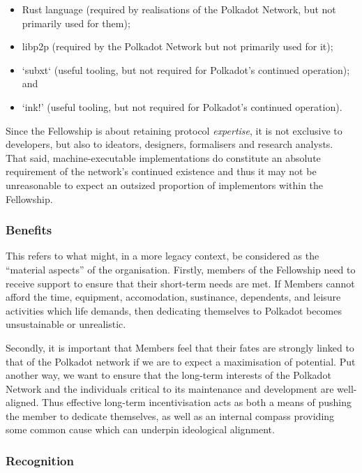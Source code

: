 \documentclass[9pt,oneside]{amsart}
\begin{document}
\begin{itemize}
  \item Rust language (required by realisations of the Polkadot Network, but not primarily used for them);
  \item libp2p (required by the Polkadot Network but not primarily used for it);
  \item `subxt` (useful tooling, but not required for Polkadot's continued operation); and
  \item `ink!' (useful tooling, but not required for Polkadot's continued operation).
\end{itemize}

Since the Fellowship is about retaining protocol \textit{expertise}, it is not exclusive to developers, but also to ideators, designers, formalisers and research analysts. That said, machine-executable implementations do constitute an absolute requirement of the network's continued existence and thus it may not be unreasonable to expect an outsized proportion of implementors within the Fellowship.

\subsubsection{Benefits}

This refers to what might, in a more legacy context, be considered as the ``material aspects'' of the organisation. Firstly, members of the Fellowship need to receive support to ensure that their short-term needs are met. If Members cannot afford the time, equipment, accomodation, sustinance, dependents, and leisure activities which life demands, then dedicating themselves to Polkadot becomes unsustainable or unrealistic.

Secondly, it is important that Members feel that their fates are strongly linked to that of the Polkadot network if we are to expect a maximisation of potential. Put another way, we want to ensure that the long-term interests of the Polkadot Network and the individuals critical to its maintenance and development are well-aligned. Thus effective long-term incentivisation acts as both a means of pushing the member to dedicate themselves, as well as an internal compass providing some common cause which can underpin ideological alignment.

\subsubsection{Recognition}
\end{document}
